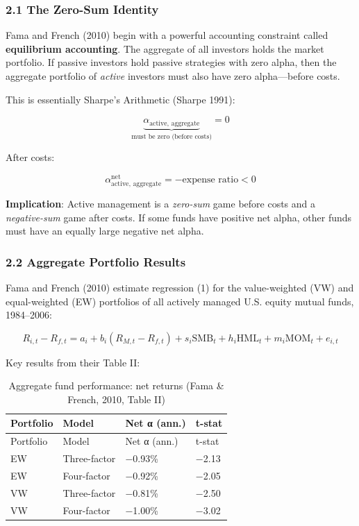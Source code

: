 \documentclass[
  letterpaper,
  DIV=11,
  numbers=noendperiod]{scrartcl}
\begin{document}
\subsubsection{2.1 The Zero-Sum Identity}\label{the-zero-sum-identity}

Fama and French (2010) begin with a powerful accounting constraint
called \textbf{equilibrium accounting}. The aggregate of all investors
holds the market portfolio. If passive investors hold passive strategies
with zero alpha, then the aggregate portfolio of \emph{active} investors
must also have zero alpha---before costs.

This is essentially Sharpe's Arithmetic (Sharpe 1991):

\[\underbrace{\alpha_{\text{active, aggregate}}}_{\text{must be zero (before costs)}} = 0\]

After costs:

\[\alpha_{\text{active, aggregate}}^{\text{net}} = -\text{expense ratio} < 0\]

\textbf{Implication}: Active management is a \emph{zero-sum} game before
costs and a \emph{negative-sum} game after costs. If some funds have
positive net alpha, other funds must have an equally large negative net
alpha.

\subsubsection{2.2 Aggregate Portfolio
Results}\label{aggregate-portfolio-results}

Fama and French (2010) estimate regression (1) for the value-weighted
(VW) and equal-weighted (EW) portfolios of all actively managed U.S.
equity mutual funds, 1984--2006:

\[R_{i,t} - R_{f,t} = a_i + b_i(R_{M,t} - R_{f,t}) + s_i \text{SMB}_t + h_i \text{HML}_t + m_i \text{MOM}_t + e_{i,t} \tag{1}\]

Key results from their Table II:

\begin{longtable}[]{@{}llll@{}}
\caption{Aggregate fund performance: net returns (Fama \& French, 2010,
Table II)}\tabularnewline
\toprule\noalign{}
Portfolio & Model & Net α (ann.) & t-stat \\
\midrule\noalign{}
\endfirsthead
\toprule\noalign{}
Portfolio & Model & Net α (ann.) & t-stat \\
\midrule\noalign{}
\endhead
\bottomrule\noalign{}
\endlastfoot
EW & Three-factor & −0.93\% & −2.13 \\
EW & Four-factor & −0.92\% & −2.05 \\
VW & Three-factor & −0.81\% & −2.50 \\
VW & Four-factor & −1.00\% & −3.02 \\
\end{longtable}
\end{document}
